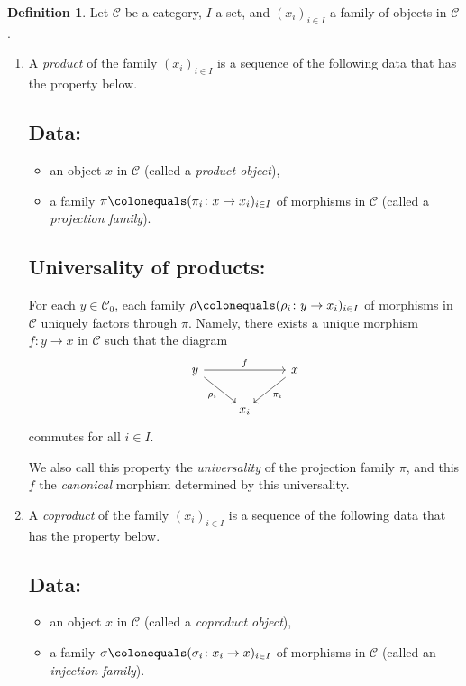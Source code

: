 \documentclass{surv-l}
\numberwithin{equation}{chapter}
\numberwithin{figure}{chapter}
\theoremstyle{plain}
\theoremstyle{definition}
\newtheorem{dfn}[thm]{Definition}
\theoremstyle{remark}
\newcommand{\Ar}[3]{\ar[from={#1}, to={#2}, #3]}
\begin{document}
\begin{dfn}\label{dfn:prod-coprod}
Let ${\mathcal{C}}$ be a category, $I$ a set, and $(x_i)_{i\in I}$ a family of objects in ${\mathcal{C}}$.
\begin{enumerate}
\item
A \emph{product} of the family $(x_i)_{i\in I}$ is a sequence of the following data
that has the property below.

\subsection*{Data:}
\begin{itemize}
\item
an object $x$ in ${\mathcal{C}}$ (called a {\em product object}),
\item
a family $\pi\colonequals  (\pi_i \colon x \to x_i)_{i\in I}$ of morphisms in ${\mathcal{C}}$ (called a \emph{projection family}).
\end{itemize}

\subsection*{Universality of products:}

For each $y \in {\mathcal{C}}_0$,
each family $\rho\colonequals  (\rho_i \colon y \to x_i)_{i\in I}$ of morphisms in ${\mathcal{C}}$
uniquely factors through $\pi$.
Namely, there exists a unique morphism $f \colon y \to x$ in ${\mathcal{C}}$ such that
the diagram
\begin{equation}\label{eq:prod}
\begin{tikzcd}
y &&x\\
&x_i
\Ar{1-1}{2-2}{"\rho_i" '}
\Ar{1-3}{2-2}{"\pi_i"}
\Ar{1-1}{1-3}{"f"}
\end{tikzcd}
\end{equation}
commutes for all $i\in I$.

We also call this property the \emph{universality} of the projection family $\pi$,
and this $f$ the \emph{canonical} morphism determined by this universality.

\item
A \emph{coproduct} of the family $(x_i)_{i\in I}$ is a sequence of the following data
that has the property below.

\subsection*{Data:}
\begin{itemize}
\item
an object $x$ in ${\mathcal{C}}$ (called a {\em coproduct object}),
\item
a family $\sigma\colonequals  (\sigma_i \colon x_i \to x)_{i\in I}$ of morphisms in ${\mathcal{C}}$ (called an \emph{injection family}).
\end{itemize}


\end{enumerate}
\end{dfn}
\end{document}
